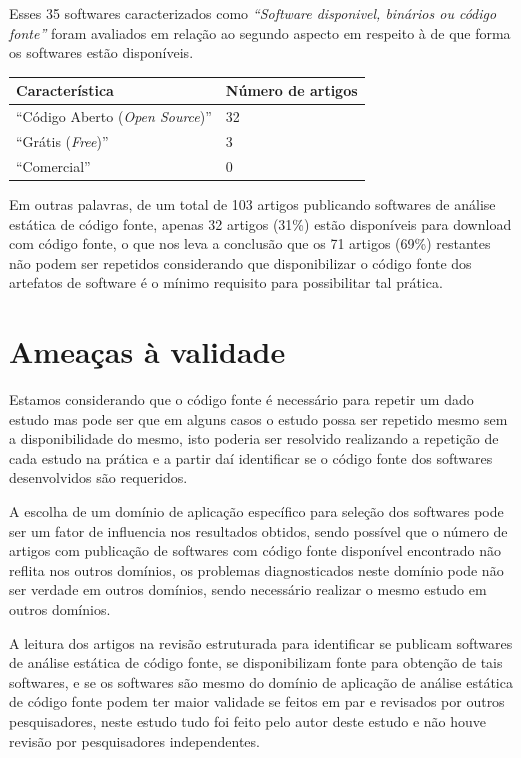 Esses 35 softwares caracterizados como {\it ``Software disponivel, binários ou
código fonte''} foram avaliados em relação ao segundo aspecto em respeito à de
que forma os softwares estão disponíveis.

\begin{table}[H]
\centering
\begin{tabular}{| l | l |}
  \hline
  {\bf Característica}                          & {\bf Número de artigos} \\
  \hline
  ``Código Aberto ({\it Open Source})''         & 32 \\
  \hline
  ``Grátis ({\it Free})''                       & 3  \\
  \hline
  ``Comercial''                                 & 0  \\
  \hline
\end{tabular}
\end{table}

Em outras palavras, de um total de 103 artigos publicando softwares de análise estática de
código fonte, apenas 32 artigos (31\%) estão disponíveis para download com
código fonte, o que nos leva a conclusão que os 71 artigos (69\%) restantes não
podem ser repetidos considerando que disponibilizar o código fonte dos
artefatos de software é o mínimo requisito para possibilitar tal prática.

\section{Ameaças à validade}

Estamos considerando que o código fonte é necessário para repetir um dado
estudo mas pode ser que em alguns casos o estudo possa ser repetido mesmo sem a
disponibilidade do mesmo, isto poderia ser resolvido realizando a repetição
de cada estudo na prática e a partir daí identificar se o código fonte dos
softwares desenvolvidos são requeridos.

A escolha de um domínio de aplicação específico para seleção dos softwares
pode ser um fator de influencia nos resultados obtidos, sendo possível que
o número de artigos com publicação de softwares com código fonte disponível
encontrado não reflita nos outros domínios, os problemas diagnosticados
neste domínio pode não ser verdade em outros domínios, sendo necessário
realizar o mesmo estudo em outros domínios.

A leitura dos artigos na revisão estruturada para identificar se publicam
softwares de análise estática de código fonte, se disponibilizam fonte para
obtenção de tais softwares, e se os softwares são mesmo do domínio de aplicação
de análise estática de código fonte podem ter maior validade se feitos em
par e revisados por outros pesquisadores, neste estudo tudo foi feito pelo
autor deste estudo e não houve revisão por pesquisadores independentes.

